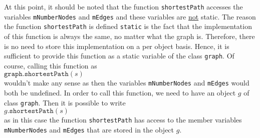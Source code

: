 At this point, it should be noted that the function \texttt{shortestPath} accesses the variables
\texttt{mNumberNodes} and \texttt{mEdges} 
and these variables are \underline{not} static.  The reason the function \texttt{shortestPath} is
defined \texttt{static} is the fact that the implementation of this function is always the same, no
matter what the graph is.  Therefore, 
there is no need to store this implementation on a per object basis.  Hence, it is sufficient to provide this
function as a static variable of the class \texttt{graph}.  Of course, calling this function as
\\[0.2cm]
\hspace*{1.3cm}
$\texttt{graph.shortestPath}(s)$
\\[0.2cm]
wouldn't make any sense as then the variables \texttt{mNumberNodes} and \texttt{mEdges} would both
be undefined.  In order to call this function, we need to have an object $g$ of class \texttt{graph}.
Then it is possible to write
\\[0.2cm]
\hspace*{1.3cm}
$g\mathtt{.shortestPath}(s)$
\\[0.2cm]
as in this case the function \texttt{shortestPath} has access to the member variables
\texttt{mNumberNodes} and \texttt{mEdges} that are stored in the object $g$.


